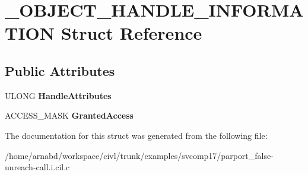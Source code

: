 \hypertarget{struct__OBJECT__HANDLE__INFORMATION}{}\section{\+\_\+\+O\+B\+J\+E\+C\+T\+\_\+\+H\+A\+N\+D\+L\+E\+\_\+\+I\+N\+F\+O\+R\+M\+A\+T\+I\+O\+N Struct Reference}
\label{struct__OBJECT__HANDLE__INFORMATION}
\subsection*{Public Attributes}
\begin{DoxyCompactItemize}
\item 
\hypertarget{struct__OBJECT__HANDLE__INFORMATION_afb307edd827a67ffeb57844f2a436202}{}U\+L\+O\+N\+G {\bfseries Handle\+Attributes}\label{struct__OBJECT__HANDLE__INFORMATION_afb307edd827a67ffeb57844f2a436202}

\item 
\hypertarget{struct__OBJECT__HANDLE__INFORMATION_a63cd4d66488b8f6ea1ba57165d6bbea8}{}A\+C\+C\+E\+S\+S\+\_\+\+M\+A\+S\+K {\bfseries Granted\+Access}\label{struct__OBJECT__HANDLE__INFORMATION_a63cd4d66488b8f6ea1ba57165d6bbea8}

\end{DoxyCompactItemize}


The documentation for this struct was generated from the following file\+:\begin{DoxyCompactItemize}
\item 
/home/arnabd/workspace/civl/trunk/examples/svcomp17/parport\+\_\+false-\/unreach-\/call.\+i.\+cil.\+c\end{DoxyCompactItemize}
